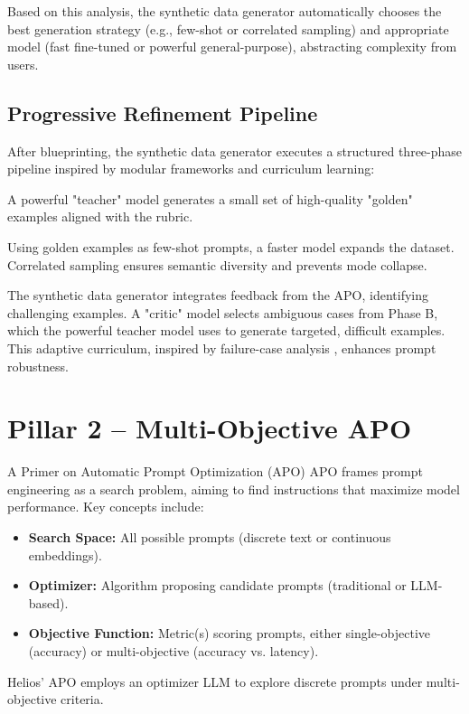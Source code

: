 \documentclass{article}
\begin{document}
Based on this analysis, the synthetic data generator automatically chooses the best generation strategy (e.g., few-shot or correlated sampling) and appropriate model (fast fine-tuned or powerful general-purpose), abstracting complexity from users.

\subsection{Progressive Refinement Pipeline}
After blueprinting, the synthetic data generator executes a structured three-phase pipeline inspired by modular frameworks \citep{patel2024datadreamertoolsyntheticdata} and curriculum learning:

\begin{description}[noitemsep]
  \item[Phase A (Seeding):] A powerful "teacher" model generates a small set of high-quality "golden" examples aligned with the rubric.
  \item[Phase B (Expansion \& Diversification):] Using golden examples as few-shot prompts, a faster model expands the dataset. Correlated sampling \citep{kowshik2024corrsynthcorrelatedsampling} ensures semantic diversity and prevents mode collapse.
  \item[Phase C (Hard-Case Mining):] The synthetic data generator integrates feedback from the APO, identifying challenging examples. A "critic" model selects ambiguous cases from Phase B, which the powerful teacher model uses to generate targeted, difficult examples. This adaptive curriculum, inspired by failure-case analysis \citep{wu2024stragoharnessingstrategicguidance}, enhances prompt robustness.
\end{description}

\section{Pillar 2 – Multi-Objective APO}
\label{sec:heliosensemble}

\begin{primerbox}{A Primer on Automatic Prompt Optimization (APO)}
  APO frames prompt engineering as a search problem, aiming to find instructions that maximize model performance. Key concepts include:
  \begin{itemize}[noitemsep]
    \item \textbf{Search Space:} All possible prompts (discrete text or continuous embeddings).
    \item \textbf{Optimizer:} Algorithm proposing candidate prompts (traditional or LLM-based).
    \item \textbf{Objective Function:} Metric(s) scoring prompts, either single-objective (accuracy) or multi-objective (accuracy vs. latency).
  \end{itemize}
  Helios' APO employs an optimizer LLM to explore discrete prompts under multi-objective criteria.
\end{primerbox}
\end{document}
